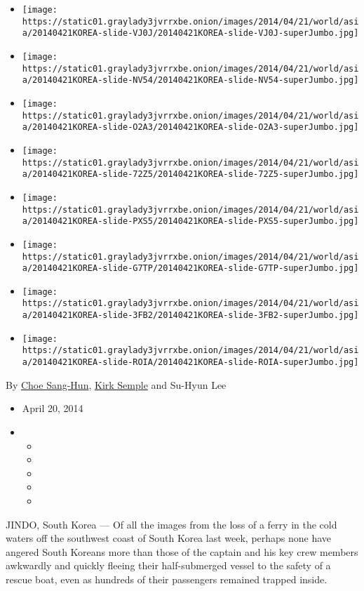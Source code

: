 \begin{itemize}
\item
  \texttt{[image: https://static01.graylady3jvrrxbe.onion/images/2014/04/21/world/asia/20140421KOREA-slide-VJ0J/20140421KOREA-slide-VJ0J-superJumbo.jpg]}
\item
  \texttt{[image: https://static01.graylady3jvrrxbe.onion/images/2014/04/21/world/asia/20140421KOREA-slide-NV54/20140421KOREA-slide-NV54-superJumbo.jpg]}
\item
  \texttt{[image: https://static01.graylady3jvrrxbe.onion/images/2014/04/21/world/asia/20140421KOREA-slide-O2A3/20140421KOREA-slide-O2A3-superJumbo.jpg]}
\item
  \texttt{[image: https://static01.graylady3jvrrxbe.onion/images/2014/04/21/world/asia/20140421KOREA-slide-72Z5/20140421KOREA-slide-72Z5-superJumbo.jpg]}
\item
  \texttt{[image: https://static01.graylady3jvrrxbe.onion/images/2014/04/21/world/asia/20140421KOREA-slide-PXS5/20140421KOREA-slide-PXS5-superJumbo.jpg]}
\item
  \texttt{[image: https://static01.graylady3jvrrxbe.onion/images/2014/04/21/world/asia/20140421KOREA-slide-G7TP/20140421KOREA-slide-G7TP-superJumbo.jpg]}
\item
  \texttt{[image: https://static01.graylady3jvrrxbe.onion/images/2014/04/21/world/asia/20140421KOREA-slide-3FB2/20140421KOREA-slide-3FB2-superJumbo.jpg]}
\item
  \texttt{[image: https://static01.graylady3jvrrxbe.onion/images/2014/04/21/world/asia/20140421KOREA-slide-ROIA/20140421KOREA-slide-ROIA-superJumbo.jpg]}
\end{itemize}

By \href{https://www.nytimes3xbfgragh.onion/by/choe-sang-hun}{Choe
Sang-Hun}, \href{https://www.nytimes3xbfgragh.onion/by/kirk-semple}{Kirk
Semple} and Su-Hyun Lee

\begin{itemize}
\item
  April 20, 2014
\item
  \begin{itemize}
  \item
  \item
  \item
  \item
  \item
  \end{itemize}
\end{itemize}

JINDO, South Korea --- Of all the images from the loss of a ferry in the
cold waters off the southwest coast of South Korea last week, perhaps
none have angered South Koreans more than those of the captain and his
key crew members awkwardly and quickly fleeing their half-submerged
vessel to the safety of a rescue boat, even as hundreds of their
passengers remained trapped inside.

